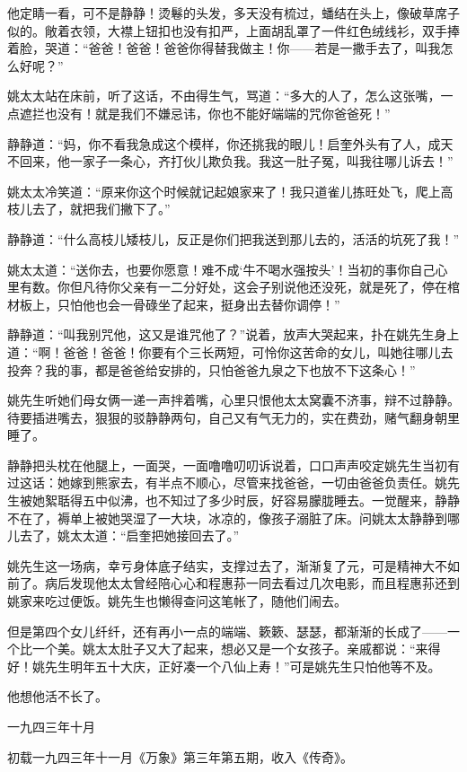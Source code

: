 \par 他定睛一看，可不是静静！烫鬈的头发，多天没有梳过，蟠结在头上，像破草席子似的。敞着衣领，大襟上钮扣也没有扣严，上面胡乱罩了一件红色绒线衫，双手捧着脸，哭道：“爸爸！爸爸！爸爸你得替我做主！你——若是一撒手去了，叫我怎么好呢？”
\par 姚太太站在床前，听了这话，不由得生气，骂道：“多大的人了，怎么这张嘴，一点遮拦也没有！就是我们不嫌忌讳，你也不能好端端的咒你爸爸死！”
\par 静静道：“妈，你不看我急成这个模样，你还挑我的眼儿！启奎外头有了人，成天不回来，他一家子一条心，齐打伙儿欺负我。我这一肚子冤，叫我往哪儿诉去！”
\par 姚太太冷笑道：“原来你这个时候就记起娘家来了！我只道雀儿拣旺处飞，爬上高枝儿去了，就把我们撇下了。”
\par 静静道：“什么高枝儿矮枝儿，反正是你们把我送到那儿去的，活活的坑死了我！”
\par 姚太太道：“送你去，也要你愿意！难不成‘牛不喝水强按头’！当初的事你自己心里有数。你但凡待你父亲有一二分好处，这会子别说他还没死，就是死了，停在棺材板上，只怕他也会一骨碌坐了起来，挺身出去替你调停！”
\par 静静道：“叫我别咒他，这又是谁咒他了？”说着，放声大哭起来，扑在姚先生身上道：“啊！爸爸！爸爸！你要有个三长两短，可怜你这苦命的女儿，叫她往哪儿去投奔？我的事，都是爸爸给安排的，只怕爸爸九泉之下也放不下这条心！”
\par 姚先生听她们母女俩一递一声拌着嘴，心里只恨他太太窝囊不济事，辩不过静静。待要插进嘴去，狠狠的驳静静两句，自己又有气无力的，实在费劲，赌气翻身朝里睡了。
\par 静静把头枕在他腿上，一面哭，一面噜噜叨叨诉说着，口口声声咬定姚先生当初有过这话：她嫁到熊家去，有半点不顺心，尽管来找爸爸，一切由爸爸负责任。姚先生被她絮聒得五中似沸，也不知过了多少时辰，好容易朦胧睡去。一觉醒来，静静不在了，褥单上被她哭湿了一大块，冰凉的，像孩子溺脏了床。问姚太太静静到哪儿去了，姚太太道：“启奎把她接回去了。”
\par 姚先生这一场病，幸亏身体底子结实，支撑过去了，渐渐复了元，可是精神大不如前了。病后发现他太太曾经陪心心和程惠荪一同去看过几次电影，而且程惠荪还到姚家来吃过便饭。姚先生也懒得查问这笔帐了，随他们闹去。
\par 但是第四个女儿纤纤，还有再小一点的端端、簌簌、瑟瑟，都渐渐的长成了——一个比一个美。姚太太肚子又大了起来，想必又是一个女孩子。亲戚都说：“来得好！姚先生明年五十大庆，正好凑一个八仙上寿！”可是姚先生只怕他等不及。
\par 他想他活不长了。
\par 一九四三年十月
\par *初载一九四三年十一月《万象》第三年第五期，收入《传奇》。


